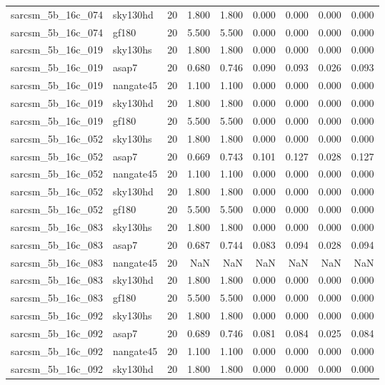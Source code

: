 \begin{tabular}{llrrrrrrr}
sarcsm\_5b\_16c\_074 & sky130hd & 20 & 1.800 & 1.800 & 0.000 & 0.000 & 0.000 & 0.000 \\
sarcsm\_5b\_16c\_074 & gf180 & 20 & 5.500 & 5.500 & 0.000 & 0.000 & 0.000 & 0.000 \\
sarcsm\_5b\_16c\_019 & sky130hs & 20 & 1.800 & 1.800 & 0.000 & 0.000 & 0.000 & 0.000 \\
sarcsm\_5b\_16c\_019 & asap7 & 20 & 0.680 & 0.746 & 0.090 & 0.093 & 0.026 & 0.093 \\
sarcsm\_5b\_16c\_019 & nangate45 & 20 & 1.100 & 1.100 & 0.000 & 0.000 & 0.000 & 0.000 \\
sarcsm\_5b\_16c\_019 & sky130hd & 20 & 1.800 & 1.800 & 0.000 & 0.000 & 0.000 & 0.000 \\
sarcsm\_5b\_16c\_019 & gf180 & 20 & 5.500 & 5.500 & 0.000 & 0.000 & 0.000 & 0.000 \\
sarcsm\_5b\_16c\_052 & sky130hs & 20 & 1.800 & 1.800 & 0.000 & 0.000 & 0.000 & 0.000 \\
sarcsm\_5b\_16c\_052 & asap7 & 20 & 0.669 & 0.743 & 0.101 & 0.127 & 0.028 & 0.127 \\
sarcsm\_5b\_16c\_052 & nangate45 & 20 & 1.100 & 1.100 & 0.000 & 0.000 & 0.000 & 0.000 \\
sarcsm\_5b\_16c\_052 & sky130hd & 20 & 1.800 & 1.800 & 0.000 & 0.000 & 0.000 & 0.000 \\
sarcsm\_5b\_16c\_052 & gf180 & 20 & 5.500 & 5.500 & 0.000 & 0.000 & 0.000 & 0.000 \\
sarcsm\_5b\_16c\_083 & sky130hs & 20 & 1.800 & 1.800 & 0.000 & 0.000 & 0.000 & 0.000 \\
sarcsm\_5b\_16c\_083 & asap7 & 20 & 0.687 & 0.744 & 0.083 & 0.094 & 0.028 & 0.094 \\
sarcsm\_5b\_16c\_083 & nangate45 & 20 & NaN & NaN & NaN & NaN & NaN & NaN \\
sarcsm\_5b\_16c\_083 & sky130hd & 20 & 1.800 & 1.800 & 0.000 & 0.000 & 0.000 & 0.000 \\
sarcsm\_5b\_16c\_083 & gf180 & 20 & 5.500 & 5.500 & 0.000 & 0.000 & 0.000 & 0.000 \\
sarcsm\_5b\_16c\_092 & sky130hs & 20 & 1.800 & 1.800 & 0.000 & 0.000 & 0.000 & 0.000 \\
sarcsm\_5b\_16c\_092 & asap7 & 20 & 0.689 & 0.746 & 0.081 & 0.084 & 0.025 & 0.084 \\
sarcsm\_5b\_16c\_092 & nangate45 & 20 & 1.100 & 1.100 & 0.000 & 0.000 & 0.000 & 0.000 \\
sarcsm\_5b\_16c\_092 & sky130hd & 20 & 1.800 & 1.800 & 0.000 & 0.000 & 0.000 & 0.000 \\

\end{tabular}
